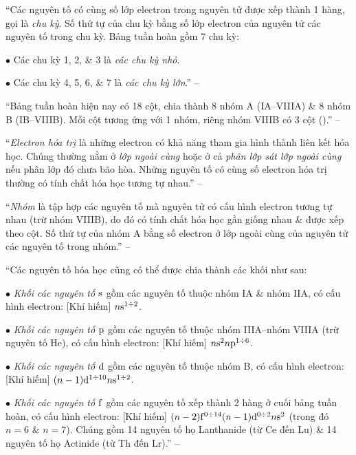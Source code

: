 \documentclass{article}
\numberwithin{equation}{section}
\begin{document}
``Các nguyên tố có cùng số lớp electron trong nguyên tử được xếp thành 1 hàng, gọi là \textit{chu kỳ}. Số thứ tự của chu kỳ bằng số lớp electron của nguyên tử các nguyên tố trong chu kỳ. Bảng tuần hoàn gồm 7 chu kỳ: 
\begin{enumerate*}
	\item[$\bullet$] Các chu kỳ 1, 2, \& 3 là \textit{các chu kỳ nhỏ}.
	\item[$\bullet$] Các chu kỳ 4, 5, 6, \& 7 là \textit{các chu kỳ lớn}.'' -- \cite[p. 38]{SGK_Hoa_Hoc_10_Chan_Troi_Sang_Tao}
\end{enumerate*}

``Bảng tuần hoàn hiện nay có 18 cột, chia thành 8 nhóm A (IA--VIIIA) \& 8 nhóm B (IB--VIIIB). Mỗi cột tương ứng với 1 nhóm, riêng nhóm VIIIB có 3 cột (\cite[Hình 5.2: \textsf{Bảng tuần hoàn các nguyên tố hóa học}, p. 38]{SGK_Hoa_Hoc_10_Chan_Troi_Sang_Tao}).'' -- \cite[p. 38]{SGK_Hoa_Hoc_10_Chan_Troi_Sang_Tao}

``\textit{Electron hóa trị} là những electron có khả năng tham gia hình thành liên kết hóa học. Chúng thường nằm ở \textit{lớp ngoài cùng} hoặc ở cả \textit{phân lớp sát lớp ngoài cùng} nếu phân lớp đó chưa bão hòa. Những nguyên tố có cùng số electron hóa trị thường có tính chất hóa học tương tự nhau.'' -- \cite[p. 39]{SGK_Hoa_Hoc_10_Chan_Troi_Sang_Tao}

``\textit{Nhóm} là tập hợp các nguyên tố mà nguyên tử có cấu hình electron tương tự nhau (trừ nhóm VIIIB), do đó có tính chất hóa học gần giống nhau \& được xếp theo cột. Số thứ tự của nhóm A bằng số electron ở lớp ngoài cùng của nguyên tử các nguyên tố trong nhóm.'' -- \cite[p. 39]{SGK_Hoa_Hoc_10_Chan_Troi_Sang_Tao}

``Các nguyên tố hóa học cũng có thể được chia thành các khối như sau:
\begin{enumerate*}
	\item[$\bullet$] \textit{Khối các nguyên tố $\rm s$} gồm các nguyên tố thuộc nhóm IA \& nhóm IIA, có cấu hình electron: [Khí hiếm] $n{\rm s}^{1\div 2}$.
	\item[$\bullet$] \textit{Khối các nguyên tố $\rm p$} gồm các nguyên tố thuộc nhóm IIIA--nhóm VIIIA (trừ nguyên tố He), có cấu hình electron: [Khí hiếm] $n{\rm s}^2n{\rm p}^{1\div 6}$.
	\item[$\bullet$] \textit{Khối các nguyên tố $\rm d$} gồm các nguyên tố thuộc nhóm B, có cấu hình electron: [Khí hiếm] $(n - 1){\rm d}^{1\div 10}n{\rm s}^{1\div 2}$.
	\item[$\bullet$] \textit{Khối các nguyên tố $\rm f$} gồm các nguyên tố xếp thành 2 hàng ở cuối bảng tuần hoàn, có cấu hình electron: [Khí hiếm] $(n - 2){\rm f}^{0\div 14}(n - 1){\rm d}^{0\div 2}n{\rm s}^2$ (trong đó $n = 6$  \& $n = 7$). Chúng gồm 14 nguyên tố họ Lanthanide (từ Ce đến Lu) \& 14 nguyên tố họ Actinide (từ Th đến Lr).'' -- \cite[pp. 39--40]{SGK_Hoa_Hoc_10_Chan_Troi_Sang_Tao}
\end{enumerate*}
\end{document}
